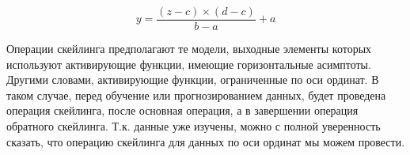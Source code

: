 {  \begin{equation}
    y = \frac{\left(z - c\right) \times \left(d - c\right)}{b - a} + a
  \end{equation}

  \par \redline Операции скейлинга предполагают те модели, выходные элементы которых используют активирующие функции, имеющие горизонтальные асимптоты. Другими словами, активирующие функции, ограниченные по оси ординат. В таком случае, перед обучение или прогнозированием данных, будет проведена операция скейлинга, после основная операция, а в завершении операция обратного скейлинга. Т.к. данные уже изучены, можно с полной уверенность сказать, что операцию скейлинга для данных по оси ординат мы можем провести. 

  \par
}

